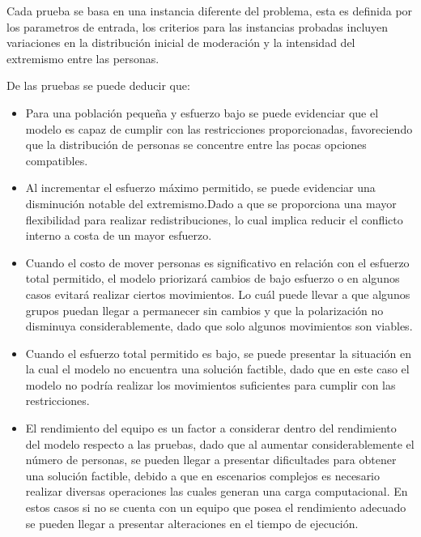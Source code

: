 \documentclass[11pt,letter]{article}
\begin{document}
Cada prueba se basa en una instancia diferente del problema, esta es definida por los parametros de entrada, los criterios para las instancias probadas incluyen variaciones en la distribución inicial de moderación y la intensidad del extremismo entre las personas.

De las pruebas se puede deducir que:
\begin{itemize}
    \item Para una población pequeña y esfuerzo bajo se puede evidenciar que el modelo es capaz de cumplir con las restricciones proporcionadas, favoreciendo que la distribución de personas se concentre entre las pocas opciones compatibles.

    \item Al incrementar el esfuerzo máximo permitido, se puede evidenciar una disminución notable del extremismo.Dado a que se proporciona una mayor flexibilidad para realizar redistribuciones, lo cual implica reducir el conflicto interno a costa de un mayor esfuerzo.

    \item Cuando el costo de mover personas es significativo en relación con el esfuerzo total permitido, el modelo priorizará cambios de bajo esfuerzo o en algunos casos evitará realizar ciertos movimientos. Lo cuál puede llevar a que algunos grupos puedan llegar a permanecer sin cambios y que la polarización no disminuya considerablemente, dado que solo algunos movimientos son viables.

    \item Cuando el esfuerzo total permitido es bajo, se puede presentar la situación en la cual el modelo no encuentra una solución factible, dado que en este caso el modelo no podría realizar los movimientos suficientes para cumplir con las restricciones.

    \item El rendimiento del equipo es un factor a considerar dentro del rendimiento del modelo respecto a las pruebas, dado que al aumentar considerablemente el número de personas, se pueden llegar a presentar dificultades para obtener una solución factible, debido a que en escenarios complejos es necesario realizar diversas operaciones las cuales generan una carga computacional. En estos casos si no se cuenta con un equipo que posea el rendimiento adecuado se pueden llegar a presentar alteraciones en el tiempo de ejecución.


\end{itemize}
\end{document}
